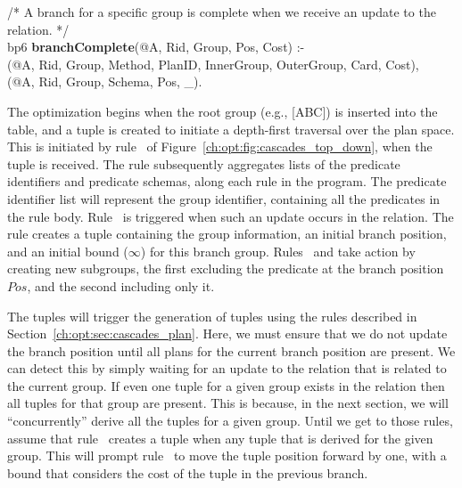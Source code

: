 \begin{figure*}
\begin{boxedminipage}{\linewidth}
/* A branch for a specific group is complete when we receive an update to the  \\
    relation. */ \\
bp6 {\bf branchComplete}(@A, Rid, Group, Pos, Cost) :- \\
(@A, Rid, Group, Method, PlanID, InnerGroup, OuterGroup, Card, Cost), \\
(@A, Rid, Group, Schema, Pos, \_). \\
  
\end{boxedminipage}
\caption{\label{ch:opt:fig:cascades_top_down} Cascades top-down search strategy rules.}
\end{figure*}

The optimization begins when the root group (e.g., [ABC]) is inserted into the
 table, and a  tuple is created to initiate a depth-first
traversal over the plan space.  This is initiated by rule~ of
Figure~\ref{ch:opt:fig:cascades_top_down}, when the 
tuple is received.  The rule subsequently aggregates lists of the predicate
identifiers and predicate schemas, along each rule in the program.  The
predicate identifier list will represent the group identifier, containing all
the predicates in the rule body.  Rule~ is triggered when such an
update occurs in the  relation.  The rule creates a  tuple
containing the group information, an initial branch position, and an initial
bound ($\infty$) for this branch group.  Rules~ and  take
action by creating new subgroups, the first excluding the predicate at the
branch position $Pos$, and the second including only it.

The  tuples will trigger the generation of  tuples using
the rules described in Section~\ref{ch:opt:sec:cascades_plan}.  Here, we must
ensure that we do not update the branch position until all plans for the
current branch position are present.  We can detect this by simply waiting for
an update to the  relation that is related to the current 
group.  If even one  tuple for a given group exists in the 
relation then all  tuples for that group are present.  This is
because, in the next section, we will ``concurrently'' derive all the 
tuples for a given group.  Until we get to those rules, assume that
rule~ creates a  tuple when any  tuple that
is derived for the given group.  This will prompt rule~ to move the
 tuple position forward by one, with a bound that considers the cost
of the  tuple in the previous branch.

